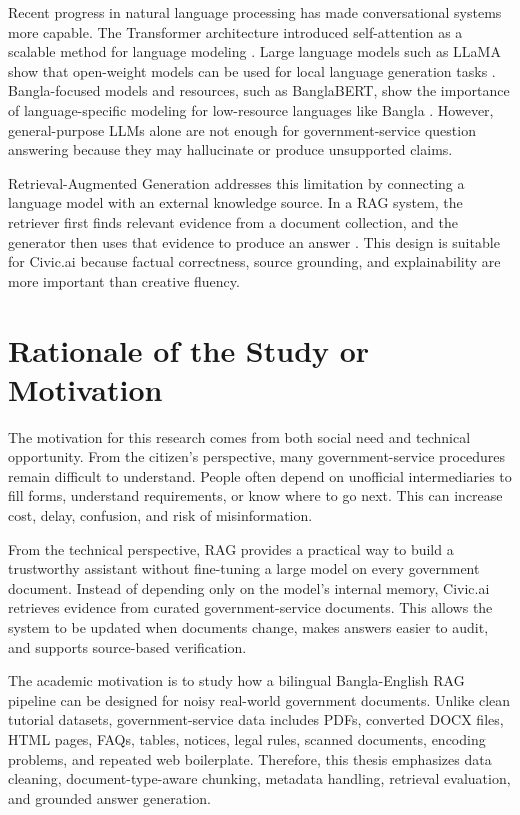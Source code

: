 \documentclass[12pt,oneside,openany]{report}
\begin{document}
Recent progress in natural language processing has made conversational systems more capable. The Transformer architecture introduced self-attention as a scalable method for language modeling \cite{vaswani2017attention}. Large language models such as LLaMA show that open-weight models can be used for local language generation tasks \cite{touvron2023llama,dubey2024llama3}. Bangla-focused models and resources, such as BanglaBERT, show the importance of language-specific modeling for low-resource languages like Bangla \cite{bhattacharjee2021banglabert}. However, general-purpose LLMs alone are not enough for government-service question answering because they may hallucinate or produce unsupported claims.

Retrieval-Augmented Generation addresses this limitation by connecting a language model with an external knowledge source. In a RAG system, the retriever first finds relevant evidence from a document collection, and the generator then uses that evidence to produce an answer \cite{lewis2020rag}. This design is suitable for Civic.ai because factual correctness, source grounding, and explainability are more important than creative fluency.

\section{Rationale of the Study or Motivation}
The motivation for this research comes from both social need and technical opportunity. From the citizen's perspective, many government-service procedures remain difficult to understand. People often depend on unofficial intermediaries to fill forms, understand requirements, or know where to go next. This can increase cost, delay, confusion, and risk of misinformation.

From the technical perspective, RAG provides a practical way to build a trustworthy assistant without fine-tuning a large model on every government document. Instead of depending only on the model's internal memory, Civic.ai retrieves evidence from curated government-service documents. This allows the system to be updated when documents change, makes answers easier to audit, and supports source-based verification.

The academic motivation is to study how a bilingual Bangla-English RAG pipeline can be designed for noisy real-world government documents. Unlike clean tutorial datasets, government-service data includes PDFs, converted DOCX files, HTML pages, FAQs, tables, notices, legal rules, scanned documents, encoding problems, and repeated web boilerplate. Therefore, this thesis emphasizes data cleaning, document-type-aware chunking, metadata handling, retrieval evaluation, and grounded answer generation.
\end{document}
